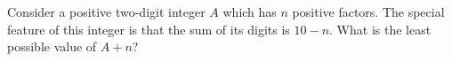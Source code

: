 Consider a positive two-digit integer $A$ which has $n$ positive factors. The special feature of this integer is that the sum of its digits is $10-n$. What is the least possible value of $A+n$?
